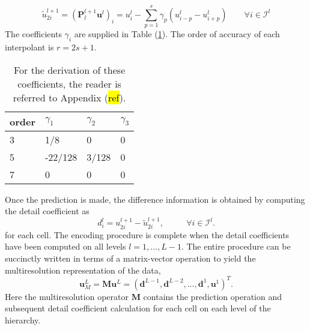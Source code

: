 \documentclass[]{article}
\begin{document}
        \begin{equation}
            \tilde{u}_{2i}^{l+1} = \left( \bm{P}_{l}^{l+1} \bm{u}^{l}
                \right)_{i} = u_{i}^{l} - \sum_{p=1}^{s} \gamma_{p} \left(
                u^{l}_{i-p} - u^{l}_{i+p} \right) \text{ } \text{ } \text{ }
                \forall i \in \bm{\mathcal{I}}^{l}
            \label{prediction}
        \end{equation}
        The coefficients $\gamma_{i}$ are supplied in Table (\ref{coeff1}). The
        order of accuracy of each interpolant is $r=2s+1$.
        \begin{table}[H]
            \center
            \begin{tabular}{|l|l|l|l|}
            \hline
                order    & $\gamma_{1}$ & $\gamma_{2}$ & $\gamma_{3}$ \\ \hline
                3 & 1/8          & 0            & 0            \\ \hline
                5 & -22/128      & 3/128        & 0            \\ \hline
                7 & 0            & 0            & 0            \\ \hline
            \end{tabular}
            \label{coeff1}
            \caption{For the derivation of these coefficients, the reader is referred to Appendix (\hl{ref}).}
        \end{table}
        Once the prediction is made, the difference information is
        obtained by computing the detail coefficient as
        \begin{equation}
            d^{l}_{i} = u^{l+1}_{2i} - \tilde{u}^{l+1}_{2i}, \text{ } \text{ }
            \text{ } \text{ } \forall i \in \bm{\mathcal{I}}^{l}.
        \end{equation}
        for each cell.  The encoding procedure is complete when the detail
        coefficients have been computed on all levels $l=1,\dots,L-1$.  The
        entire procedure can be succinctly written in terms of a matrix-vector
        operation to yield the multiresolution representation of the data,
        \begin{equation}
            \bm{u}^{L}_{M} = \bm{M} \bm{u}^{L} = \left( \bm{d}^{L-1}, \bm{d}^{L-2},
            \dots, \bm{d}^{1}, \bm{u}^{1} \right)^{T}.
        \end{equation}
        Here the multiresolution operator $\bm{M}$ contains the prediction
        operation and subsequent detail coefficient calculation for each cell
        on each level of the hierarchy.
\end{document}
